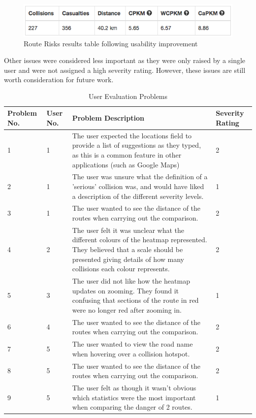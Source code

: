 \documentclass[authoryearcitations]{UoYCSproject}
\begin{document}
\begin{figure}
	\center
	\includegraphics[scale=0.75]{resultstableafter}
	\caption{Route Risks results table following usability improvement}
	\label{fig:resultstableafter}
\end{figure}

Other issues were considered less important as they were only raised by a single user and were not assigned a high severity rating. However, these issues are still worth consideration for future work.

\begin{table}
\caption{User Evaluation Problems}
\begin{tabular}{| p{1.5cm} | p{1.5cm} | p{9cm} | p{1.5cm} |}
	\hline
	\textbf{Problem No.} & \textbf{User No.} & \textbf{Problem Description} & \textbf{Severity Rating} \\ \hline
	1 & 1 & The user expected the locations field to provide a list of suggestions as they typed, as this is a common feature in other applications (such as Google Maps)  & 2 \\ \hline
	2 & 1 & The user was unsure what the definition of a 'serious' collision was, and would have liked a description of the different severity levels. & 1 \\ \hline
	3 & 1 & The user wanted to see the distance of the routes when carrying out the comparison. & 2 \\ \hline
	4 & 2 & The user felt it was unclear what the different colours of the heatmap represented. They believed that a scale should be presented giving details of how many collisions each colour represents. & 2 \\ \hline
	5 & 3 & The user did not like how the heatmap updates on zooming. They found it confusing that sections of the route in red were no longer red after zooming in.  & 1 \\ \hline
	6 & 4 & The user wanted to see the distance of the routes when carrying out the comparison. & 2 \\ \hline
	7 & 5 & The user wanted to view the road name when hovering over a collision hotspot. & 2 \\ \hline
	8 & 5 & The user wanted to see the distance of the routes when carrying out the comparison. & 2 \\ \hline
	9 & 5 & The user felt as though it wasn't obvious which statistics were the most important when comparing the danger of 2 routes. & 1 \\ \hline
\end{tabular}
\label{tab:userevalprobs}
\end{table}
\end{document}
